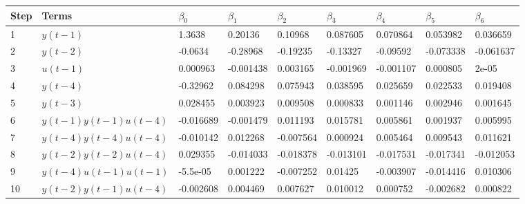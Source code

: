 \begin{tabular}{lllllllll}
Step & Terms & $\beta_{0}$ & $\beta_{1}$ & $\beta_{2}$ & $\beta_{3}$ & $\beta_{4}$ & $\beta_{5}$ & $\beta_{6}$ \\ 
\hline 
1 & $y(t-1)$ & 1.3638 & 0.20136 & 0.10968 & 0.087605 & 0.070864 & 0.053982 & 0.036659 \\ 
2 & $y(t-2)$ & -0.0634 & -0.28968 & -0.19235 & -0.13327 & -0.09592 & -0.073338 & -0.061637 \\ 
3 & $u(t-1)$ & 0.000963 & -0.001438 & 0.003165 & -0.001969 & -0.001107 & 0.000805 & 2e-05 \\ 
4 & $y(t-4)$ & -0.32962 & 0.084298 & 0.075943 & 0.038595 & 0.025659 & 0.022533 & 0.019408 \\ 
5 & $y(t-3)$ & 0.028455 & 0.003923 & 0.009508 & 0.000833 & 0.001146 & 0.002946 & 0.001645 \\ 
6 & $y(t-1)y(t-1)u(t-4)$ & -0.016689 & -0.001479 & 0.011193 & 0.015781 & 0.005861 & 0.001937 & 0.005995 \\ 
7 & $y(t-4)y(t-4)u(t-4)$ & -0.010142 & 0.012268 & -0.007564 & 0.000924 & 0.005464 & 0.009543 & 0.011621 \\ 
8 & $y(t-2)y(t-2)u(t-4)$ & 0.029355 & -0.014033 & -0.018378 & -0.013101 & -0.017531 & -0.017341 & -0.012053 \\ 
9 & $y(t-4)u(t-1)u(t-1)$ & -5.5e-05 & 0.001222 & -0.007252 & 0.01425 & -0.003907 & -0.014416 & 0.010306 \\ 
10 & $y(t-2)y(t-1)u(t-4)$ & -0.002608 & 0.004469 & 0.007627 & 0.010012 & 0.000752 & -0.002682 & 0.000822 \\ 
\hline 
\end{tabular}